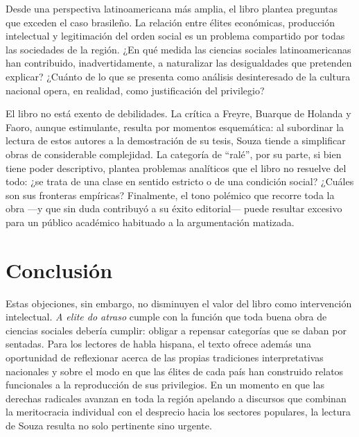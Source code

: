 Desde una perspectiva latinoamericana más amplia, el libro plantea preguntas que exceden el caso brasileño. La relación entre élites económicas, producción intelectual y legitimación del orden social es un problema compartido por todas las sociedades de la región. ¿En qué medida las ciencias sociales latinoamericanas han contribuido, inadvertidamente, a naturalizar las desigualdades que pretenden explicar? ¿Cuánto de lo que se presenta como análisis desinteresado de la cultura nacional opera, en realidad, como justificación del privilegio?

El libro no está exento de debilidades. La crítica a Freyre, Buarque de Holanda y Faoro, aunque estimulante, resulta por momentos esquemática: al subordinar la lectura de estos autores a la demostración de su tesis, Souza tiende a simplificar obras de considerable complejidad. La categoría de “ralé”, por su parte, si bien tiene poder descriptivo, plantea problemas analíticos que el libro no resuelve del todo: ¿se trata de una clase en sentido estricto o de una condición social? ¿Cuáles son sus fronteras empíricas? Finalmente, el tono polémico que recorre toda la obra —y que sin duda contribuyó a su éxito editorial— puede resultar excesivo para un público académico habituado a la argumentación matizada.


\section{Conclusión}
Estas objeciones, sin embargo, no disminuyen el valor del libro como intervención intelectual. \textit{A elite do atraso} cumple con la función que toda buena obra de ciencias sociales debería cumplir: obligar a repensar categorías que se daban por sentadas. Para los lectores de habla hispana, el texto ofrece además una oportunidad de reflexionar acerca de las propias tradiciones interpretativas nacionales y sobre el modo en que las élites de cada país han construido relatos funcionales a la reproducción de sus privilegios. En un momento en que las derechas radicales avanzan en toda la región apelando a discursos que combinan la meritocracia individual con el desprecio hacia los sectores populares, la lectura de Souza resulta no solo pertinente sino urgente.


